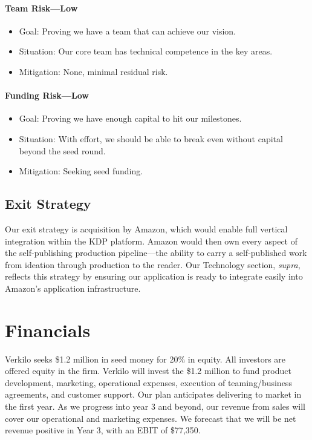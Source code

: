 \documentclass[11pt,openany]{book}
\providecommand{\tightlist}{%
  \setlength{\itemsep}{0pt}\setlength{\parskip}{0pt}}
\begin{document}
\hypertarget{team-risklow}{%
\subsubsection{Team Risk---Low}\label{team-risklow}}

\begin{itemize}
\tightlist
\item
  Goal: Proving we have a team that can achieve our vision.
\item
  Situation: Our core team has technical competence in the key areas.
\item
  Mitigation: None, minimal residual risk.
\end{itemize}

\hypertarget{funding-risklow}{%
\subsubsection{Funding Risk---Low}\label{funding-risklow}}

\begin{itemize}
\tightlist
\item
  Goal: Proving we have enough capital to hit our milestones.
\item
  Situation: With effort, we should be able to break even without
  capital beyond the seed round.
\item
  Mitigation: Seeking seed funding.
\end{itemize}

\hypertarget{exit-strategy}{%
\section{Exit Strategy}\label{exit-strategy}}

Our exit strategy is acquisition by Amazon, which would enable full
vertical integration within the KDP platform. Amazon would then own
every aspect of the self-publishing production pipeline---the ability to
carry a self-published work from ideation through production to the
reader. Our Technology section, \emph{supra}, reflects this strategy by
ensuring our application is ready to integrate easily into Amazon's
application infrastructure.

\hypertarget{financials}{%
\chapter{Financials}\label{financials}}

Verkilo seeks \$1.2 million in seed money for 20\% in equity. All
investors are offered equity in the firm. Verkilo will invest the \$1.2
million to fund product development, marketing, operational expenses,
execution of teaming/business agreements, and customer support. Our plan
anticipates delivering to market in the first year. As we progress into
year 3 and beyond, our revenue from sales will cover our operational and
marketing expenses. We forecast that we will be net revenue positive in
Year 3, with an EBIT of \$77,350.
\end{document}
